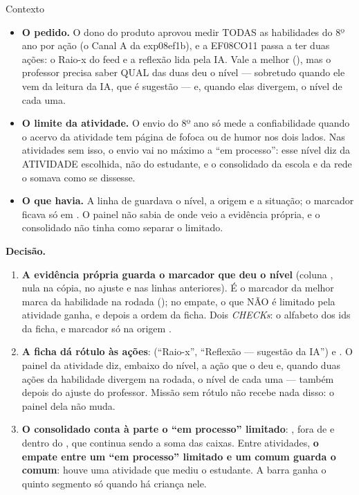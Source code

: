\begin{especificacao}{Contexto}
\begin{itemize}
  \item \textbf{O pedido.} O dono do produto aprovou medir TODAS as
    habilidades do 8º ano por ação (o Canal A da exp08ef1b), e a EF08CO11 passa
    a ter duas ações: o Raio-x do feed e a reflexão lida pela IA. Vale a melhor
    (), mas o professor precisa saber QUAL das duas deu o nível
    --- sobretudo quando ele vem da leitura da IA, que é sugestão --- e, quando
    elas divergem, o nível de cada uma.
  \item \textbf{O limite da atividade.} O envio do 8º ano só mede a
    confiabilidade quando o acervo da atividade tem página de fofoca ou de
    humor nos dois lados. Nas atividades sem isso, o envio vai no máximo a
    \enquote{em processo}: esse nível diz da ATIVIDADE escolhida, não do
    estudante, e o consolidado da escola e da rede o somava como se dissesse.
  \item \textbf{O que havia.} A linha de  guardava o nível, a
    origem e a situação; o marcador ficava só em . O
    painel não sabia de onde veio a evidência própria, e o consolidado não
    tinha como separar o limitado.
\end{itemize}
\end{especificacao}

\textbf{Decisão.}

\begin{enumerate}
  \item \textbf{A evidência própria guarda o marcador que deu o nível}
    (coluna , nula na cópia, no ajuste e nas linhas
    anteriores). É o marcador da melhor marca da habilidade na rodada
    (); no empate, o que NÃO é limitado pela
    atividade ganha, e depois a ordem da ficha. Dois \emph{CHECKs}: o alfabeto
    dos ids da ficha, e marcador só na origem .
  \item \textbf{A ficha dá rótulo às ações}: 
    (\enquote{Raio-x}, \enquote{Reflexão --- sugestão da IA}) e
    . O painel da atividade diz, embaixo do nível, a
    ação que o deu e, quando duas ações da habilidade divergem na rodada, o
    nível de cada uma --- também depois do ajuste do professor. Missão sem
    rótulo não recebe nada disso: o painel dela não muda.
  \item \textbf{O consolidado conta à parte o \enquote{em processo} limitado}:
    , fora de  e dentro do ,
    que continua sendo a soma das caixas. Entre atividades, \textbf{o empate
    entre um \enquote{em processo} limitado e um comum guarda o comum}: houve
    uma atividade que mediu o estudante. A barra ganha o quinto segmento só
    quando há criança nele.
\end{enumerate}

